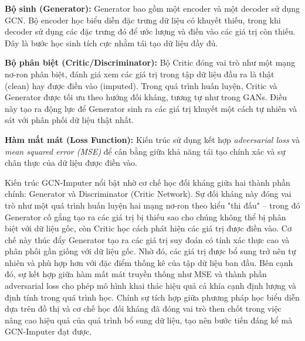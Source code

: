 \vspace{0.5em}

\textbf{Bộ sinh (Generator):} Generator bao gồm một encoder và một decoder sử dụng GCN. Bộ encoder học biểu diễn đặc trưng dữ liệu có khuyết thiếu, trong khi decoder sử dụng các đặc trưng đó để ước lượng và điền vào các giá trị còn thiếu. Đây là bước học sinh tích cực nhằm tái tạo dữ liệu đầy đủ.

\vspace{0.5em}

\textbf{Bộ phân biệt (Critic/Discriminator):} Bộ Critic đóng vai trò như một mạng nơ-ron phân biệt, đánh giá xem các giá trị trong tập dữ liệu đầu ra là thật (clean) hay được điền vào (imputed). Trong quá trình huấn luyện, Critic và Generator được tối ưu theo hướng đối kháng, tương tự như trong GANs. Điều này tạo ra động lực để Generator sinh ra các giá trị khuyết một cách tự nhiên và sát với phân phối dữ liệu thật nhất.

\vspace{0.5em}

\textbf{Hàm mất mát (Loss Function):} Kiến trúc sử dụng kết hợp \textit{adversarial loss} và \textit{mean squared error (MSE)} để cân bằng giữa khả năng tái tạo chính xác và sự chân thực của dữ liệu được điền vào.

Kiến trúc GCN-Imputer nổi bật nhờ cơ chế học đối kháng giữa hai thành phần chính: Generator và Discriminator (Critic Network). Sự đối kháng này đóng vai trò như một quá trình huấn luyện hai mạng nơ-ron theo kiểu "thi đấu" – trong đó Generator cố gắng tạo ra các giá trị bị thiếu sao cho chúng không thể bị phân biệt với dữ liệu gốc, còn Critic học cách phát hiện các giá trị được điền vào. Cơ chế này thúc đẩy Generator tạo ra các giá trị suy đoán có tính xác thực cao và phân phối gần giống với dữ liệu gốc. Nhờ đó, các giá trị được bổ sung trở nên tự nhiên và phù hợp hơn với đặc điểm thống kê của tập dữ liệu ban đầu. Bên cạnh đó, sự kết hợp giữa hàm mất mát truyền thống như MSE và thành phần adversarial loss cho phép mô hình khai thác hiệu quả cả khía cạnh định lượng và định tính trong quá trình học. Chính sự tích hợp giữa phương pháp học biểu diễn dựa trên đồ thị và cơ chế học đối kháng đã đóng vai trò then chốt trong việc nâng cao hiệu quả của quá trình bổ sung dữ liệu, tạo nên bước tiến đáng kể mà GCN-Imputer đạt được.